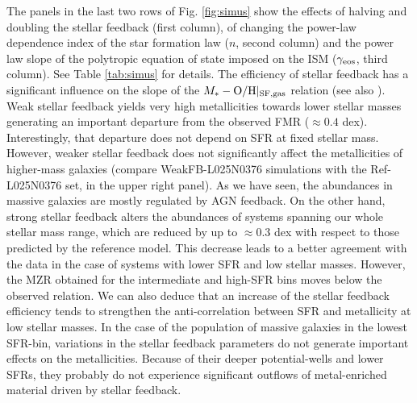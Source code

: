 \documentclass[useAMS,usenatbib]{mn2e}
\begin{document}
The panels in the last two rows of Fig. \ref{fig:simus} show the effects of 
halving and doubling the stellar feedback (first column), of changing the
power-law dependence index of the star formation law ($n$, second column) and 
the power law slope of the polytropic equation of state imposed on the ISM ($\gamma_{\rm eos}$, third column).  
See Table \ref{tab:simus} for details.
The efficiency of stellar feedback has a significant influence on the slope of the $M_* - {\rm O/H}|_{\rm SF,gas}$ relation 
(see also \citealt{crain2015}).  Weak stellar feedback yields very high metallicities towards lower stellar masses 
generating an important departure from the observed FMR ($\approx 0.4$ dex). 
Interestingly, that departure does not depend on SFR at fixed stellar mass. 
However, weaker stellar feedback does not significantly affect the metallicities of higher-mass galaxies 
(compare WeakFB-L025N0376 simulations with the Ref-L025N0376 set, in the upper right panel).  
As we have seen, the abundances in massive galaxies are mostly regulated by AGN feedback.   
On the other hand, strong stellar feedback alters the abundances of systems spanning our whole stellar mass range, 
which are reduced by up to $\approx 0.3$ dex with respect to those predicted by the reference model. 
This decrease leads to a better agreement with the data in the case of systems with lower SFR and low stellar masses.  
However, the MZR obtained for the intermediate and high-SFR bins moves below the observed relation.   
We can also deduce that an increase of the stellar feedback efficiency tends to strengthen the anti-correlation between SFR and metallicity at low stellar masses.  
In the case of the population of massive galaxies in the lowest SFR-bin, variations in the stellar feedback parameters do not 
generate important effects on the metallicities.  Because of their deeper potential-wells and lower SFRs,
they probably do not
experience significant outflows of metal-enriched material driven by stellar feedback.
\end{document}
